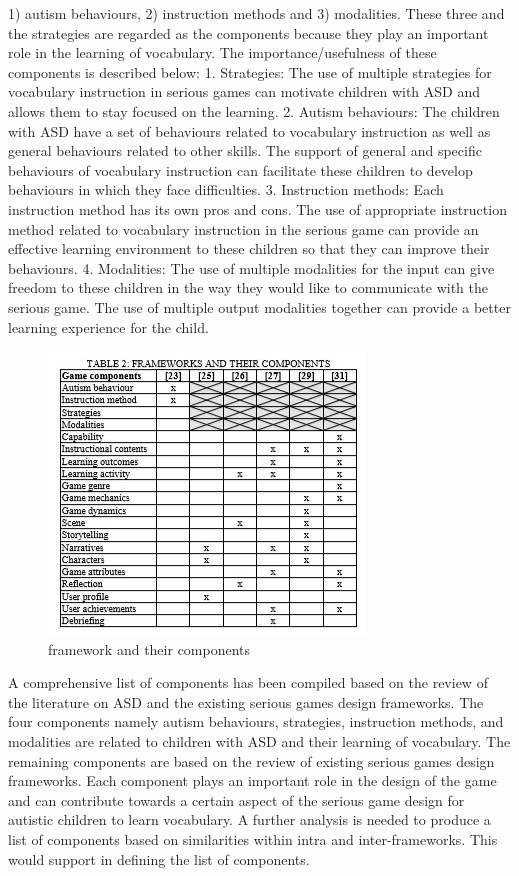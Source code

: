 1) autism behaviours, 2) instruction methods and 3) modalities. These three and the strategies are regarded as the components because they play an important role in the learning of vocabulary. The importance/usefulness of these components is described below: 1. Strategies: The use of multiple strategies for vocabulary instruction in serious games can motivate children with ASD and allows them to stay focused on the learning. 2. Autism behaviours: The children with ASD have a set of behaviours related to vocabulary instruction as well as general behaviours related to other skills. The support of general and specific behaviours of vocabulary instruction can facilitate these children to develop behaviours in which they face difficulties.  3. Instruction methods: Each instruction method has its own pros and cons. The use of appropriate instruction method related to vocabulary instruction in the serious game can provide an effective learning environment to these children so that they can improve their behaviours. 4. Modalities: The use of multiple modalities for the input can give freedom to these children in the way they would like to communicate with the serious game. The use of multiple output modalities together can provide a better learning experience for the child.\\
\begin{figure}[h]
\label{ss}
\centering
\includegraphics[width= 10 cm]{framework and their components.JPG}
\caption{framework and their components}
\end{figure}

A comprehensive list of components has been compiled based on the review of the literature on ASD and the existing serious games design frameworks. The four components namely autism behaviours, strategies, instruction methods, and modalities are related to children with ASD and their learning of vocabulary. The remaining components are based on the review of existing serious games design frameworks. Each component plays an important role in the design of the game and can contribute towards a certain aspect of the serious game design for autistic children to learn vocabulary. A further analysis is needed to produce a list of components based on similarities within intra and inter-frameworks. This would support in defining the list of components.  
 


